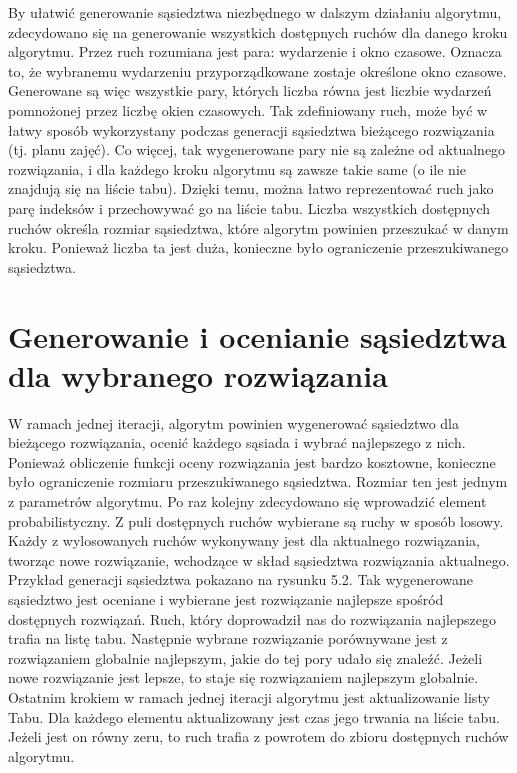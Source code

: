By ułatwić generowanie sąsiedztwa niezbędnego w dalszym działaniu algorytmu, zdecydowano się na generowanie wszystkich dostępnych ruchów dla danego kroku algorytmu. Przez ruch rozumiana jest para: wydarzenie i okno czasowe. Oznacza to, że wybranemu wydarzeniu przyporządkowane zostaje określone okno czasowe. Generowane są więc wszystkie pary, których liczba równa jest liczbie wydarzeń pomnożonej przez liczbę okien czasowych. Tak zdefiniowany ruch, może być w łatwy sposób wykorzystany podczas generacji sąsiedztwa bieżącego rozwiązania (tj. planu zajęć). Co więcej, tak wygenerowane pary nie są zależne od aktualnego rozwiązania, i dla każdego kroku algorytmu są zawsze takie same (o ile nie znajdują się na liście tabu). Dzięki temu, można łatwo reprezentować ruch jako parę indeksów i przechowywać go na liście tabu. Liczba wszystkich dostępnych ruchów określa rozmiar sąsiedztwa, które algorytm powinien przeszukać w danym kroku. Ponieważ liczba ta jest duża, konieczne było ograniczenie przeszukiwanego sąsiedztwa.

\section{Generowanie i ocenianie sąsiedztwa dla wybranego rozwiązania}

W ramach jednej iteracji, algorytm powinien wygenerować sąsiedztwo dla bieżącego rozwiązania, ocenić każdego sąsiada i wybrać najlepszego z nich. Ponieważ obliczenie funkcji oceny rozwiązania jest bardzo kosztowne, konieczne było ograniczenie rozmiaru przeszukiwanego sąsiedztwa. Rozmiar ten jest jednym z parametrów algorytmu. Po raz kolejny zdecydowano się wprowadzić element probabilistyczny. Z puli dostępnych ruchów wybierane są ruchy w sposób losowy. Każdy z wylosowanych ruchów wykonywany jest dla aktualnego rozwiązania, tworząc nowe rozwiązanie, wchodzące w skład sąsiedztwa rozwiązania aktualnego. Przykład generacji sąsiedztwa pokazano na rysunku 5.2. Tak wygenerowane sąsiedztwo jest oceniane i wybierane jest rozwiązanie najlepsze spośród dostępnych rozwiązań. Ruch, który doprowadził nas do rozwiązania najlepszego trafia na listę tabu. Następnie wybrane rozwiązanie porównywane jest z rozwiązaniem globalnie najlepszym, jakie do tej pory udało się znaleźć. Jeżeli nowe rozwiązanie jest lepsze, to staje się rozwiązaniem najlepszym globalnie. Ostatnim krokiem w ramach jednej iteracji algorytmu jest aktualizowanie listy Tabu. Dla każdego elementu aktualizowany jest czas jego trwania na liście tabu. Jeżeli jest on równy zeru, to ruch trafia z powrotem do zbioru dostępnych ruchów algorytmu.

